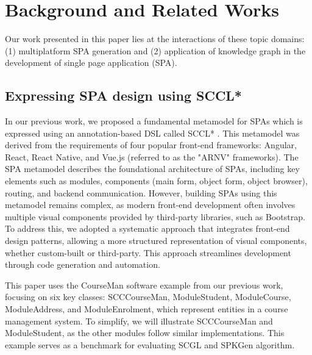 \documentclass[runningheads]{llncs}
\begin{document}
\section{Background and Related Works} \label{section2}

Our work presented in this paper lies at the interactions of these topic domains: (1) multiplatform SPA generation and (2) application of knowledge graph in the development of single page application (SPA). 

\subsection{Expressing SPA design using SCCL*}
In our previous work, we proposed a fundamental metamodel for SPAs which is expressed using an annotation-based DSL called SCCL* \cite{le_generating_2022}. This metamodel was derived from the requirements of four popular front-end frameworks: Angular, React, React Native, and Vue.js (referred to as the "ARNV" frameworks). The SPA metamodel describes the foundational architecture of SPAs, including key elements such as modules, components (main form, object form, object browser), routing, and backend communication.
However, building SPAs using this metamodel remains complex, as modern front-end development often involves multiple visual components provided by third-party libraries, such as Bootstrap. To address this, we adopted a systematic approach that integrates front-end design patterns, allowing a more structured representation of visual components, whether custom-built or third-party. This approach streamlines development through code generation and automation.

This paper uses the CourseMan software example from our previous work, focusing on six key classes: SCCCourseMan, ModuleStudent, ModuleCourse, ModuleAddress, and ModuleEnrolment, which represent entities in a course management system. To simplify, we will illustrate SCCCourseMan and ModuleStudent, as the other modules follow similar implementations. This example serves as a benchmark for evaluating SCGL  and SPKGen algorithm.
\end{document}
